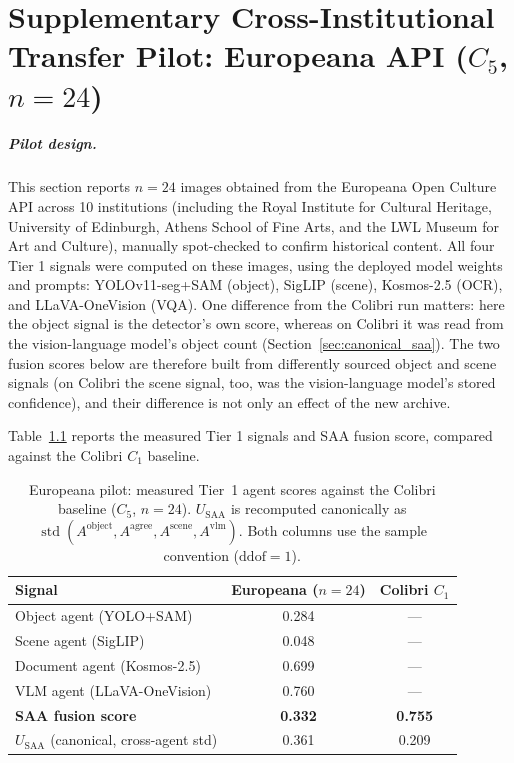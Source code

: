 \documentclass[12pt,a4paper]{report}
\begin{document}
\chapter[Cross-Institutional Transfer Pilot: Europeana (\texorpdfstring{$C_5$}{C5}, \texorpdfstring{$n=24$}{n = 24})]{Supplementary Cross-Institutional Transfer Pilot: Europeana API ($C_5$, $n=24$)}
\label{app:europeana}

\paragraph{Pilot design.} This section reports $n=24$ images obtained from the Europeana Open Culture API across 10 institutions (including the Royal Institute for Cultural Heritage, University of Edinburgh, Athens School of Fine Arts, and the LWL Museum for Art and Culture), manually spot-checked to confirm historical content. All four Tier 1 signals were computed on these images, using the deployed model weights and prompts: YOLOv11-seg+SAM (object), SigLIP (scene), Kosmos-2.5 (OCR), and LLaVA-OneVision (VQA). One difference from the Colibri run matters: here the object signal is the detector's own score, whereas on Colibri it was read from the vision-language model's object count (Section~\ref{sec:canonical_saa}). The two fusion scores below are therefore built from differently sourced object and scene signals (on Colibri the scene signal, too, was the vision-language model's stored confidence), and their difference is not only an effect of the new archive.

Table~\ref{tab:europeana_real_pilot} reports the measured Tier 1 signals and SAA fusion score, compared against the Colibri $C_1$ baseline.

\begin{table}[!htbp]
\centering
\caption[Europeana pilot: agent scores against Colibri]{Europeana pilot: measured Tier~1 agent scores against the Colibri baseline ($C_5$, $n=24$). $U_{\text{SAA}}$ is recomputed canonically as $\operatorname{std}(A^{\text{object}}, A^{\text{agree}}, A^{\text{scene}}, A^{\text{vlm}})$. Both columns use the sample convention ($\mathrm{ddof}{=}1$).}
\label{tab:europeana_real_pilot}
\begin{tabular}{lcc}
\toprule
\textbf{Signal} & \textbf{Europeana ($n=24$)} & \textbf{Colibri $C_1$} \\
\midrule
Object agent (YOLO+SAM)     & 0.284 & --- \\
Scene agent (SigLIP)        & 0.048 & --- \\
Document agent (Kosmos-2.5) & 0.699 & --- \\
VLM agent (LLaVA-OneVision) & 0.760 & --- \\
\textbf{SAA fusion score}   & \textbf{0.332} & \textbf{0.755} \\
$U_{\text{SAA}}$ (canonical, cross-agent std) & 0.361 & 0.209 \\
\bottomrule
\end{tabular}
\end{table}
\end{document}
